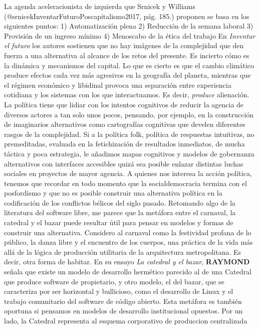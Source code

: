 \documentclass[
]{article}
\begin{document}
La agenda aceleracionista de izquierda que Srnicek y Williams
(@srnicekInventarFuturoPoscapitalismo2017, pág. 185.) proponen se basa
en los siguientes puntos: 1) Automatización plena 2) Reducción de la
semana laboral 3) Provisión de un ingreso mínimo 4) Menoscabo de la
ética del trabajo En \emph{Inventar el futuro} los autores sostienen que
no hay imágenes de la complejidad que den fuerza a una alternativa al
alcance de los retos del presente. Es incierto cómo es la dinámica y
mecanismos del capital. Lo que es cierto es que el cambio climático
produce efectos cada vez más agresivos en la geografía del planeta,
mientras que el régimen económico y libidinal provoca una separación
entre experiencia cotidiana y los sistemas con los que interactuamos. Es
decir, \emph{produce} alienación. La política tiene que lidiar con los
intentos cognitivos de reducir la agencia de diversos actores a tan solo
unos pocos, pensando, por ejemplo, en la construcción de imaginarios
alternativos como cartografías cognitivas que develen diferentes rasgos
de la complejidad. Si a la política folk, política de respuestas
intuitivas, no premeditadas, evaluada en la fetichización de resultados
inmediatos, de mucha táctica y poca estrategia, le añadimos mapas
cognitivos y modelos de gobernanza alternativos con interfaces
accesibles quizá sea posible enlazar distintas luchas sociales en
proyectos de mayor agencia. A quienes nos interesa la acción política,
tenemos que recordar en todo momento que la socialdemocracia termina con
el posfordismo y que no es posible construir una alternativa política en
la codificación de los conflictos bélicos del siglo pasado. Retomando
algo de la literatura del software libre, me parece que la metáfora
entre el carnaval, la catedral y el bazar puede resultar útil para
pensar en modelos y formas de construir una alternativa. Considero al
carnaval como la festividad profana de lo público, la danza libre y el
encuentro de los cuerpos, una práctica de la vida más allá de la lógica
de producción utilitaria de la arquitectura metropolitana. Es decir,
otra forma de habitar. En su ensayo \emph{La catedral y el bazar},
\textbf{RAYMOND} señala que existe un modelo de desarrollo hermético
parecido al de una Catedral que produce software de propietario, y otro
modelo, el del bazar, que se caracteriza por ser horizontal y
bullicioso, como el desarrollo de Linux y el trabajo comunitario del
software de código abierto. Esta metáfora es también oportuna si
pensamos en modelos de desarrollo institucional opuestos. Por un lado,
la Catedral representa al esquema corporativo de produccion centralizada
\end{document}
